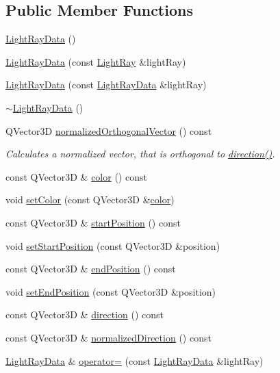\subsection*{Public Member Functions}
\begin{DoxyCompactItemize}
\item 
\hyperlink{class_light_ray_data_ac0cb11da1651f8ff7b8ed9d785b68a27}{Light\+Ray\+Data} ()
\item 
\hyperlink{class_light_ray_data_a50350aa163fd7c1a54f97cefafd2d2f7}{Light\+Ray\+Data} (const \hyperlink{class_light_ray}{Light\+Ray} \&light\+Ray)
\item 
\hyperlink{class_light_ray_data_a9344f139cafb257f61f4d800fbecd905}{Light\+Ray\+Data} (const \hyperlink{class_light_ray_data}{Light\+Ray\+Data} \&light\+Ray)
\item 
\hyperlink{class_light_ray_data_a6cd92465c9ba1da296d30a32487a6ac0}{$\sim$\+Light\+Ray\+Data} ()
\item 
Q\+Vector3\+D \hyperlink{class_light_ray_data_acada2319ae380a11a405817cd9cd3d65}{normalized\+Orthogonal\+Vector} () const 
\begin{DoxyCompactList}\small\item\em Calculates a normalized vector, that is orthogonal to \hyperlink{class_light_ray_data_aaecf9f1d378eebf6d577eaa588930a4f}{direction()}. \end{DoxyCompactList}\item 
const Q\+Vector3\+D \& \hyperlink{class_light_ray_data_a64a5b7f8d4c3af9cc3e8c1a6c6ea8c57}{color} () const 
\item 
void \hyperlink{class_light_ray_data_ad8fead207765a43bb1167e2ce95e85a4}{set\+Color} (const Q\+Vector3\+D \&\hyperlink{class_light_ray_data_a64a5b7f8d4c3af9cc3e8c1a6c6ea8c57}{color})
\item 
const Q\+Vector3\+D \& \hyperlink{class_light_ray_data_af040092e873e42d0d31f803452fc648e}{start\+Position} () const 
\item 
void \hyperlink{class_light_ray_data_a464a868047052152f375cb45ac476eb2}{set\+Start\+Position} (const Q\+Vector3\+D \&position)
\item 
const Q\+Vector3\+D \& \hyperlink{class_light_ray_data_ab47d397dcffe8a2c8da0cf4d8bbbd2bc}{end\+Position} () const 
\item 
void \hyperlink{class_light_ray_data_ad7ec7b96408f0fb7f603687c54804d3b}{set\+End\+Position} (const Q\+Vector3\+D \&position)
\item 
const Q\+Vector3\+D \& \hyperlink{class_light_ray_data_aaecf9f1d378eebf6d577eaa588930a4f}{direction} () const 
\item 
const Q\+Vector3\+D \& \hyperlink{class_light_ray_data_a791bbf3c85d32004d0d7d155cd248a43}{normalized\+Direction} () const 
\item 
\hyperlink{class_light_ray_data}{Light\+Ray\+Data} \& \hyperlink{class_light_ray_data_a2dc01f58929829517a90b1fc29f12942}{operator=} (const \hyperlink{class_light_ray_data}{Light\+Ray\+Data} \&light\+Ray)
\end{DoxyCompactItemize}
